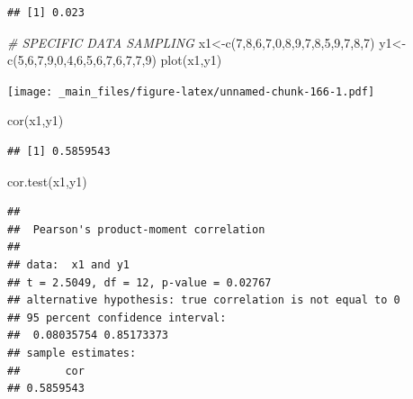 \documentclass[
  notitlepage,
  onecolumn,
  openany]{book}
\newenvironment{Shaded}{\begin{snugshade}}{\end{snugshade}}
\newcommand{\CommentTok}[1]{\textcolor[rgb]{0.56,0.35,0.01}{\textit{#1}}}
\newcommand{\DecValTok}[1]{\textcolor[rgb]{0.00,0.00,0.81}{#1}}
\newcommand{\FunctionTok}[1]{\textcolor[rgb]{0.00,0.00,0.00}{#1}}
\newcommand{\NormalTok}[1]{#1}
\newcommand{\OtherTok}[1]{\textcolor[rgb]{0.56,0.35,0.01}{#1}}
\begin{document}
\begin{verbatim}
## [1] 0.023
\end{verbatim}

\begin{Shaded}
\begin{Highlighting}[]
\CommentTok{\# SPECIFIC DATA SAMPLING}
\NormalTok{x1}\OtherTok{\textless{}{-}}\FunctionTok{c}\NormalTok{(}\DecValTok{7}\NormalTok{,}\DecValTok{8}\NormalTok{,}\DecValTok{6}\NormalTok{,}\DecValTok{7}\NormalTok{,}\DecValTok{0}\NormalTok{,}\DecValTok{8}\NormalTok{,}\DecValTok{9}\NormalTok{,}\DecValTok{7}\NormalTok{,}\DecValTok{8}\NormalTok{,}\DecValTok{5}\NormalTok{,}\DecValTok{9}\NormalTok{,}\DecValTok{7}\NormalTok{,}\DecValTok{8}\NormalTok{,}\DecValTok{7}\NormalTok{)}
\NormalTok{y1}\OtherTok{\textless{}{-}}\FunctionTok{c}\NormalTok{(}\DecValTok{5}\NormalTok{,}\DecValTok{6}\NormalTok{,}\DecValTok{7}\NormalTok{,}\DecValTok{9}\NormalTok{,}\DecValTok{0}\NormalTok{,}\DecValTok{4}\NormalTok{,}\DecValTok{6}\NormalTok{,}\DecValTok{5}\NormalTok{,}\DecValTok{6}\NormalTok{,}\DecValTok{7}\NormalTok{,}\DecValTok{6}\NormalTok{,}\DecValTok{7}\NormalTok{,}\DecValTok{7}\NormalTok{,}\DecValTok{9}\NormalTok{)}
\FunctionTok{plot}\NormalTok{(x1,y1)}
\end{Highlighting}
\end{Shaded}

\texttt{[image: \_main\_files/figure-latex/unnamed-chunk-166-1.pdf]}

\begin{Shaded}
\begin{Highlighting}[]
\FunctionTok{cor}\NormalTok{(x1,y1)}
\end{Highlighting}
\end{Shaded}

\begin{verbatim}
## [1] 0.5859543
\end{verbatim}

\begin{Shaded}
\begin{Highlighting}[]
\FunctionTok{cor.test}\NormalTok{(x1,y1)}
\end{Highlighting}
\end{Shaded}

\begin{verbatim}
## 
##  Pearson's product-moment correlation
## 
## data:  x1 and y1
## t = 2.5049, df = 12, p-value = 0.02767
## alternative hypothesis: true correlation is not equal to 0
## 95 percent confidence interval:
##  0.08035754 0.85173373
## sample estimates:
##       cor 
## 0.5859543
\end{verbatim}
\end{document}
